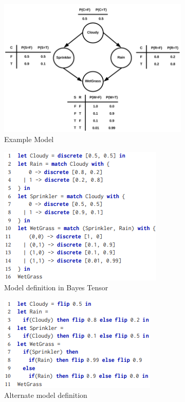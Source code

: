 \documentclass{beamer}
\begin{document}
\begin{frame}
	\frametitle{}
	\begin{figure}
		\begin{subfigure}{0.5 \textwidth}
			\includegraphics[scale=0.4]{imgs/example_model.png}
			\caption{Example Model}
		\end{subfigure}%
		\begin{subfigure}{0.5 \textwidth}
			\includegraphics[scale=0.4]{imgs/example_code.png}
			\caption{Model definition in Bayes Tensor}
		\end{subfigure}
		\begin{subfigure}{0.5 \textwidth}
			\includegraphics[scale=0.4]{imgs/example_code2.png}
			\caption{Alternate model definition}
		\end{subfigure}%
		\begin{subfigure}{0.5 \textwidth}

\end{subfigure}
\end{figure}
\end{frame}
\end{document}
